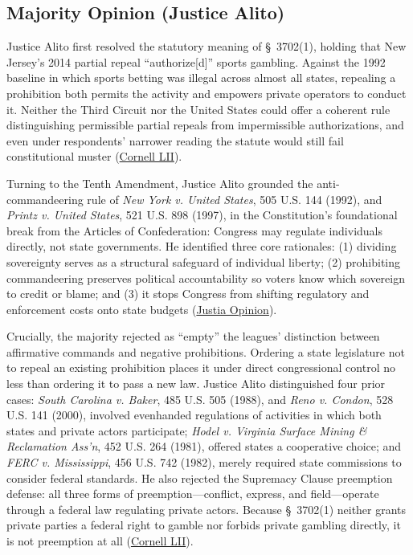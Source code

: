 \documentclass[12pt]{article}
\begin{document}
\subsection{Majority Opinion (Justice Alito)}

Justice Alito first resolved the statutory meaning of \S~3702(1), holding that New Jersey's 2014 partial repeal ``authorize[d]'' sports gambling. Against the 1992 baseline in which sports betting was illegal across almost all states, repealing a prohibition both permits the activity and empowers private operators to conduct it. Neither the Third Circuit nor the United States could offer a coherent rule distinguishing permissible partial repeals from impermissible authorizations, and even under respondents' narrower reading the statute would still fail constitutional muster (\href{https://www.law.cornell.edu/supremecourt/text/16-476}{Cornell LII}).

Turning to the Tenth Amendment, Justice Alito grounded the anti-commandeering rule of \textit{New York v. United States}, 505 U.S. 144 (1992), and \textit{Printz v. United States}, 521 U.S. 898 (1997), in the Constitution's foundational break from the Articles of Confederation: Congress may regulate individuals directly, not state governments. He identified three core rationales: (1) dividing sovereignty serves as a structural safeguard of individual liberty; (2) prohibiting commandeering preserves political accountability so voters know which sovereign to credit or blame; and (3) it stops Congress from shifting regulatory and enforcement costs onto state budgets (\href{https://supreme.justia.com/cases/federal/us/584/16-476/}{Justia Opinion}).

Crucially, the majority rejected as ``empty'' the leagues' distinction between affirmative commands and negative prohibitions. Ordering a state legislature not to repeal an existing prohibition places it under direct congressional control no less than ordering it to pass a new law. Justice Alito distinguished four prior cases: \textit{South Carolina v. Baker}, 485 U.S. 505 (1988), and \textit{Reno v. Condon}, 528 U.S. 141 (2000), involved evenhanded regulations of activities in which both states and private actors participate; \textit{Hodel v. Virginia Surface Mining \& Reclamation Ass'n}, 452 U.S. 264 (1981), offered states a cooperative choice; and \textit{FERC v. Mississippi}, 456 U.S. 742 (1982), merely required state commissions to consider federal standards. He also rejected the Supremacy Clause preemption defense: all three forms of preemption---conflict, express, and field---operate through a federal law regulating private actors. Because \S~3702(1) neither grants private parties a federal right to gamble nor forbids private gambling directly, it is not preemption at all (\href{https://www.law.cornell.edu/supremecourt/text/16-476}{Cornell LII}).
\end{document}
